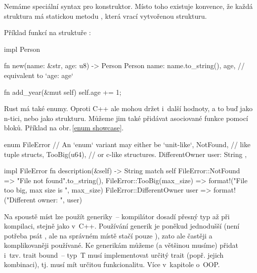 \documentclass[main.tex]{subfiles}
\begin{document}
Nemáme speciální syntax pro konstruktor. Místo toho existuje konvence, že každá struktura
má statickou metodu , která vrací vytvořenou strukturu.

Příklad funkcí na struktuře :

\obrazek
\begin{rustcode}
    impl Person {
        fn new(name: &str, age: u8) -> Person {
            Person {
                name: name.to_string(),
                age, // equivalent to `age: age`
            }
        }

        fn add_year(&mut self) {
            self.age += 1;
        }
    }
\end{rustcode}

Rust má také enumy. Oproti C++ ale mohou držet i~další hodnoty, a to buď jako n-tici, nebo
jako strukturu. Můžeme jim také přidávat asociované funkce pomocí  bloků.
\cite[sekce\,6.1]{thebook} Příklad na obr.\,\ref{enum showcase}.

\obrazek
\begin{rustcode}
    enum FileError {
        // An `enum` variant may either be `unit-like`,
        NotFound,
        // like tuple structs,
        TooBig(u64),
        // or c-like structures.
        DifferentOwner { user: String },
    }

    impl FileError {
        fn description(&self) -> String {
            match self {
                FileError::NotFound => "File not found".to_string(),
                FileError::TooBig(max_size) => {
                    format!("File too big, max size is {}", max_size)
                }
                FileError::DifferentOwner { user } => {
                    format!("Different owner: {}", user)
                }
            }
        }
    }
\end{rustcode}


Na spoustě míst lze použít generiky~-- kompilátor dosadí přesný typ až při kompilaci,
stejně jako v~C++. Používání generik je poněkud jednodušší (není potřeba psát
, ale na správném místě stačí pouze ), zato ale
častěji a komplikovaněji používané. Ke generikám můžeme (a většinou musíme) přidat i~tzv.
trait bound~-- typ~T musí implementovat určitý trait (popř. jejich kombinaci), tj. musí
mít určitou funkcionalitu. Více v~kapitole o~OOP.
\end{document}
